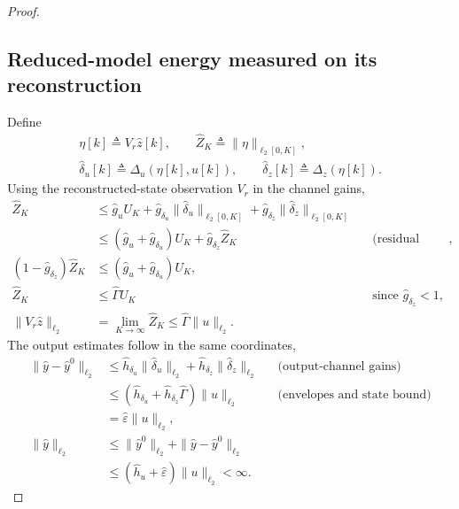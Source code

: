\documentclass{l4dc2027}
\newcommand{\eqdef}{\triangleq}
\begin{document}
\begin{proof}
\subsection{Reduced-model energy measured on its reconstruction}
Define
\[
 \begin{gathered}
 \eta[k]\eqdef V_r\widehat z[k],\qquad
 \widehat Z_K\eqdef\|\eta\|_{\ell_2[0,K]},\\
 \widehat\delta_u[k]\eqdef\Delta_u(\eta[k],u[k]),\qquad
 \widehat\delta_z[k]\eqdef\Delta_z(\eta[k]).
 \end{gathered}
\]
Using the reconstructed-state observation \mbox{$V_r$} in the channel gains,
\[
 \begin{aligned}
 \widehat Z_K
 &\le\widehat g_uU_K
   +\widehat g_{\delta_u}\|\widehat\delta_u\|_{\ell_2[0,K]}
   +\widehat g_{\delta_z}\|\widehat\delta_z\|_{\ell_2[0,K]}\\
 &\le(\widehat g_u+\widehat g_{\delta_u})U_K
       +\widehat g_{\delta_z}\widehat Z_K
 &&\text{(residual envelopes)},\\
 (1-\widehat g_{\delta_z})\widehat Z_K
 &\le(\widehat g_u+\widehat g_{\delta_u})U_K,\\
 \widehat Z_K&\le\widehat\Gamma U_K
 &&\text{since }\widehat g_{\delta_z}<1,\\
 \|V_r\widehat z\|_{\ell_2}
 &=\lim_{K\to\infty}\widehat Z_K
 \le\widehat\Gamma\|u\|_{\ell_2}.
 \end{aligned}
\]
The output estimates follow in the same coordinates,
\[
 \begin{aligned}
 \|\widehat y-\widehat y^0\|_{\ell_2}
 &\le\widehat h_{\delta_u}\|\widehat\delta_u\|_{\ell_2}
    +\widehat h_{\delta_z}\|\widehat\delta_z\|_{\ell_2}
 &&\text{(output-channel gains)}\\
 &\le(\widehat h_{\delta_u}
       +\widehat h_{\delta_z}\widehat\Gamma)\|u\|_{\ell_2}
 &&\text{(envelopes and state bound)}\\
 &=\widehat\varepsilon\|u\|_{\ell_2},\\
 \|\widehat y\|_{\ell_2}
 &\le\|\widehat y^0\|_{\ell_2}
      +\|\widehat y-\widehat y^0\|_{\ell_2}\\
 &\le(\widehat h_u+\widehat\varepsilon)\|u\|_{\ell_2}<\infty.
 \end{aligned}
\]

\end{proof}
\end{document}
